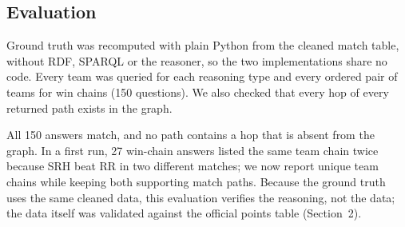 \subsection{Evaluation}
Ground truth was recomputed with plain Python from the cleaned match table, without RDF, SPARQL or the
reasoner, so the two implementations share no code. Every team was queried for each reasoning type and every
ordered pair of teams for win chains (150 questions). We also checked that every hop of every returned path
exists in the graph.

\begin{table}[H]\centering

\caption{Multi-hop reasoning accuracy against independent ground truth.}
\end{table}


All 150 answers match, and no path contains a hop that is absent from the graph. In a first run, 27 win-chain
answers listed the same team chain twice because SRH beat RR in two different matches; we now report unique team
chains while keeping both supporting match paths. Because the ground truth uses the same cleaned data, this
evaluation verifies the reasoning, not the data; the data itself was validated against the official points table
(Section~2).
